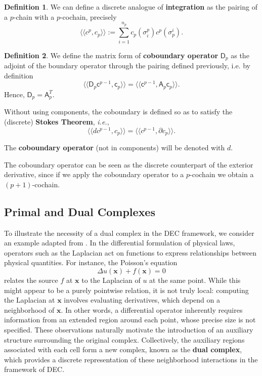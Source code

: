 \documentclass{article}
\theoremstyle{definition} %
\newtheorem{Def}{Definition}
\theoremstyle{plain} %
\theoremstyle{remark} %
\newcommand{\llangle}{\langle \langle}
\newcommand{\rrangle}{\rangle \rangle}
\begin{document}
\begin{Def}
        We can define a discrete analogue of \textbf{integration} as the pairing of a $p$-chain with a $p$-cochain, precisely
        \begin{equation}
            \llangle c^p, c_p \rrangle := \sum_{i=1}^{n_p} c_p(\sigma^p_i)c^p(\sigma_p^i).
        \end{equation}
\end{Def}

\begin{Def}
    We define the matrix form of \textbf{coboundary operator} $\mathsf{D}_p$ as the adjoint of the boundary operator through the pairing defined previously, i.e. by definition
    \begin{equation}
        \llangle \mathsf{D}_p\mathsf{c}^{p-1}, \mathsf{c}_p \rrangle = \llangle \mathsf{c}^{p-1}, \mathsf{A}_p\mathsf{c}_p \rrangle.
    \end{equation}
    Hence, $\mathsf{D}_p = \mathsf{A}^T_p$.
    
    Without using components, the coboundary is defined so as to satisfy the (discrete) \textbf{Stokes Theorem}, \textsl{i.e.}, 
    \begin{equation}
        \llangle d c^{p-1}, c_p \rrangle = \llangle c^{p-1}, \partial c_p \rrangle. \label{eq: discrete_Stokes}
    \end{equation}
    
    The \textbf{coboundary operator} (not in components) will be denoted with $d$.
\end{Def}

The coboundary operator can be seen as the discrete counterpart of the exterior derivative, since if we apply the coboundary operator to a $p$-cochain we obtain a $(p+1)$-cochain.

\subsection{Primal and Dual Complexes}
\label{sec: primal_dual_complexes}
To illustrate the necessity of a dual complex in the DEC framework, we consider an example adapted from \cite{tonti2013mathematical}. In the differential formulation of physical laws, operators such as the Laplacian act on functions to express relationships between physical quantities. For instance, the Poisson’s equation
\begin{equation}
    \Delta u(\mathbf{x}) + f(\mathbf{x}) = 0
\end{equation}
relates the source $f$ at $\mathbf{x}$ to the Laplacian of $u$ at the same point. While this might appear to be a purely pointwise relation, it is not truly local: computing the Laplacian at $\mathbf{x}$ involves evaluating derivatives, which depend on a neighborhood of $\mathbf{x}$. In other words, a differential operator inherently requires information from an extended region around each point, whose precise size is not specified. These observations naturally motivate the introduction of an auxiliary structure surrounding the original complex. Collectively, the auxiliary regions associated with each cell form a new complex, known as the \textbf{dual complex}, which provides a discrete representation of these neighborhood interactions in the framework of DEC.
\end{document}
